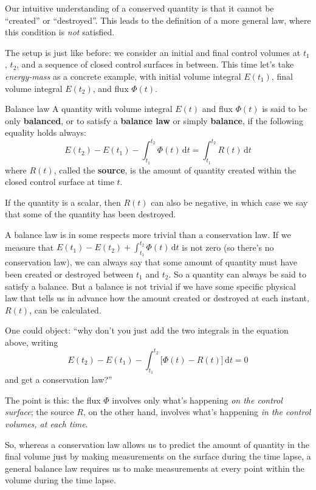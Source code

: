 \documentclass[a4paper,12pt,%
onecolumn,oneside,titlepage,%
british%
]{memoir}
\newcommand*{\di}{\mathrm{d}}%
\renewcommand*{\|}[1][]{\nonscript\:#1\vert\nonscript\:\mathopen{}}
\newcommand*{\yE}{E}
\newcommand*{\yH}{\varPhi}%
\newcommand*{\yR}{R}%
\newcommand*{\energym}{energy-mass}
\begin{document}
Our intuitive understanding of a conserved quantity is that it cannot be \enquote{created} or \enquote{destroyed}. This leads to the definition of a more general law, where this condition is \emph{not} satisfied.

The setup is just like before: we consider an initial and final control volumes at $t_{1}$, $t_{2}$, and a sequence of closed control surfaces in between. This time let's take \emph{\energym} as a concrete example, with initial volume integral $\yE(t_{1})$, final volume integral $\yE(t_{2})$, and flux $\yH(t)$.

\begin{definition}{Balance law}
  A quantity with volume integral $\yE(t)$ and flux $\yH(t)$ is said to be only \textbf{balanced}, or to satisfy a \textbf{balance law} or simply \textbf{balance}, if the following equality holds always:
  \begin{equation}
    \label{eq:balanced}
    \yE(t_{2}) - \yE(t_{1}) - \int_{t_{1}}^{t_{2}}\!\!\yH(t)\, \di t = \int_{t_{1}}^{t_{2}}\!\!\yR(t)\,\di t
  \end{equation}
  where $\yR(t)$, called the \textbf{source}, is the amount of quantity created within the closed control surface at time $t$.
\end{definition}
If the quantity is a scalar, then $\yR(t)$ can also be negative, in which case we say that some of the quantity has been destroyed.

A balance law is in some respects more trivial than a conservation law. If we measure that $\yE(t_{1}) - \yE(t_{2}) + \int_{t_{1}}^{t_{2}}\!\!\yH(t)\, \di t$ is not zero (so there's no conservation law), we can always say that some amount of quantity must have been created or destroyed between $t_{1}$ and $t_{2}$. So a quantity can always be said to satisfy a balance. But a balance is not trivial if we have some specific physical law that tells us in advance how the amount created or destroyed at each instant, $\yR(t)$, can be calculated.

\begin{warning}
  One could object: \enquote{why don't you just add the two integrals in the equation above, writing
  \begin{equation*}
    \yE(t_{2}) - \yE(t_{1}) - \int_{t_{1}}^{t_{2}}\!\!\bigl[\yH(t)-\yR(t)\bigr]\, \di t = 0
  \end{equation*}
  and get a conservation law?}

The point is this: the flux $\yH$ involves only what's happening \emph{on the control surface}; the source $\yR$, on the other hand, involves what's happening \emph{in the control volumes, at each time}.
\end{warning}
So, whereas a conservation law allows us to predict the amount of quantity in the final volume just by making measurements on the surface during the time lapse, a general balance law requires us to make measurements at every point within the volume during the time lapse.
\end{document}
